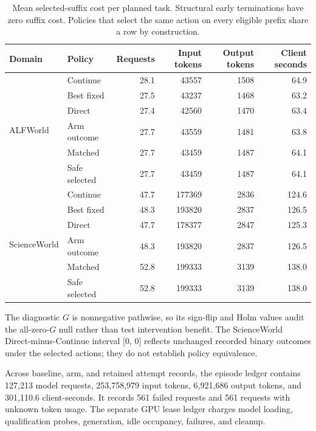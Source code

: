 \begin{table}[ht]
\caption{Mean selected-suffix cost per planned task. Structural early terminations have zero suffix cost. Policies that select the same action on every eligible prefix share a row by construction.}
\label{tab:costs}
\centering
\small
\begin{tabular}{@{}llrrrr@{}}
\toprule
Domain & Policy & Requests & Input tokens & Output tokens & Client seconds \\
\midrule
\multirow{6}{*}{ALFWorld} & Continue & 28.1 & 43557 & 1508 & 64.9 \\
 & Best fixed & 27.5 & 43237 & 1468 & 63.2 \\
 & Direct & 27.4 & 42560 & 1470 & 63.4 \\
 & Arm outcome & 27.7 & 43559 & 1481 & 63.8 \\
 & Matched & 27.7 & 43459 & 1487 & 64.1 \\
 & Safe selected & 27.7 & 43459 & 1487 & 64.1 \\
\midrule
\multirow{6}{*}{ScienceWorld} & Continue & 47.7 & 177369 & 2836 & 124.6 \\
 & Best fixed & 48.3 & 193820 & 2837 & 126.5 \\
 & Direct & 47.7 & 178377 & 2847 & 125.3 \\
 & Arm outcome & 48.3 & 193820 & 2837 & 126.5 \\
 & Matched & 52.8 & 199333 & 3139 & 138.0 \\
 & Safe selected & 52.8 & 199333 & 3139 & 138.0 \\
\bottomrule
\end{tabular}
\end{table}

The diagnostic $G$ is nonnegative pathwise, so its sign-flip and Holm values audit the all-zero-$G$ null rather than test intervention benefit. The ScienceWorld Direct-minus-Continue interval [0, 0] reflects unchanged recorded binary outcomes under the selected actions; they do not establish policy equivalence.

Across baseline, arm, and retained attempt records, the episode ledger contains 127,213 model requests, 253,758,979 input tokens, 6,921,686 output tokens, and 301,110.6 client-seconds. It records 561 failed requests and 561 requests with unknown token usage. The separate GPU lease ledger charges model loading, qualification probes, generation, idle occupancy, failures, and cleanup.



